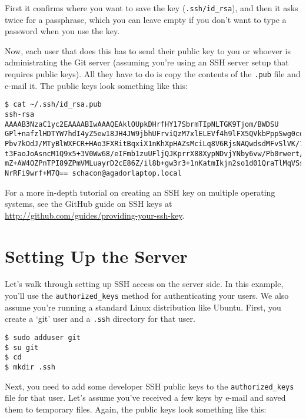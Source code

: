 \documentclass[a4paper]{book}
\begin{document}
First it confirms where you want to save the key (\texttt{.ssh/id\_rsa}), and then it asks twice for a passphrase, which you can leave empty if you don't want to type a password when you use the key.

Now, each user that does this has to send their public key to you or whoever is administrating the Git server (assuming you're using an SSH server setup that requires public keys). All they have to do is copy the contents of the \texttt{.pub} file and e-mail it. The public keys look something like this:

\begin{shaded}\begin{verbatim}
$ cat ~/.ssh/id_rsa.pub
ssh-rsa AAAAB3NzaC1yc2EAAAABIwAAAQEAklOUpkDHrfHY17SbrmTIpNLTGK9Tjom/BWDSU
GPl+nafzlHDTYW7hdI4yZ5ew18JH4JW9jbhUFrviQzM7xlELEVf4h9lFX5QVkbPppSwg0cda3
Pbv7kOdJ/MTyBlWXFCR+HAo3FXRitBqxiX1nKhXpHAZsMciLq8V6RjsNAQwdsdMFvSlVK/7XA
t3FaoJoAsncM1Q9x5+3V0Ww68/eIFmb1zuUFljQJKprrX88XypNDvjYNby6vw/Pb0rwert/En
mZ+AW4OZPnTPI89ZPmVMLuayrD2cE86Z/il8b+gw3r3+1nKatmIkjn2so1d01QraTlMqVSsbx
NrRFi9wrf+M7Q== schacon@agadorlaptop.local
\end{verbatim}\end{shaded}

For a more in-depth tutorial on creating an SSH key on multiple operating systems, see the GitHub guide on SSH keys at \url{http://github.com/guides/providing-your-ssh-key}.

\section{Setting Up the Server}\label{setting-up-the-server}

Let's walk through setting up SSH access on the server side. In this example, you'll use the \texttt{authorized\_keys} method for authenticating your users. We also assume you're running a standard Linux distribution like Ubuntu. First, you create a `git' user and a \texttt{.ssh} directory for that user.

\begin{shaded}\begin{verbatim}
$ sudo adduser git
$ su git
$ cd
$ mkdir .ssh
\end{verbatim}\end{shaded}

Next, you need to add some developer SSH public keys to the \texttt{authorized\_keys} file for that user. Let's assume you've received a few keys by e-mail and saved them to temporary files. Again, the public keys look something like this:
\end{document}
